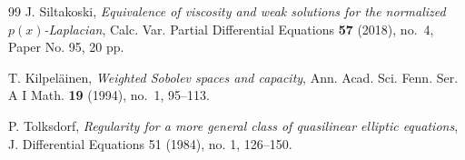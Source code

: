 \documentclass[12pt]{amsart}
\newcommand{\1}{\mathbf 1}
\begin{document}
\begin{thebibliography}{99}
J. Siltakoski, {\em Equivalence of viscosity and weak solutions for the normalized $p(x)$-Laplacian}, Calc. Var. Partial Differential Equations {\bf 57} (2018), no.~4, Paper No. 95, 20 pp.

 T. Kilpel\"{a}inen, {\em Weighted Sobolev spaces and capacity}, Ann. Acad. Sci. Fenn. Ser. A I Math. {\bf 19} (1994), no.~1, 95--113.

 P. Tolksdorf, {\em Regularity for a more general class of quasilinear elliptic equations},
J. Differential Equations 51 (1984), no. 1, 126--150.


\end{thebibliography}
\end{document}
